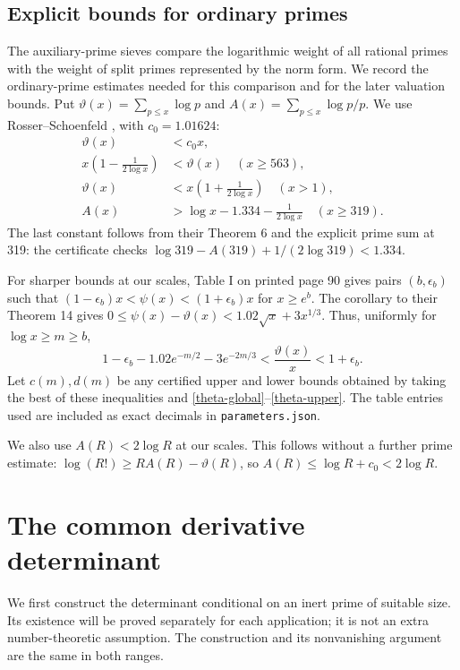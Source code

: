 \documentclass[11pt]{article}
\begin{document}
\subsection{Explicit bounds for ordinary primes}\label{prime-inputs}
The auxiliary-prime sieves compare the logarithmic weight of all rational primes
with the weight of split primes represented by the norm form. We record
the ordinary-prime estimates needed for this comparison and for the
later valuation bounds.
Put \(\vartheta(x)=\sum_{p\le x}\log p\) and
\(A(x)=\sum_{p\le x}\log p/p\). We use Rosser--Schoenfeld
\cite{rs}, with \(c_0=1.01624\):
\begin{align}
 \vartheta(x)&<c_0x,\label{theta-global}\\
 x\left(1-\frac1{2\log x}\right)&<\vartheta(x)
       \quad(x\ge563),\label{theta-lower}\\
 \vartheta(x)&<x\left(1+\frac1{2\log x}\right)\quad(x>1),\label{theta-upper}\\
 A(x)&>\log x-1.334-\frac1{2\log x}\quad(x\ge319).
 \label{mertens}
\end{align}
The last constant follows from their Theorem 6 and the explicit prime
sum at 319: the certificate checks
\(\log319-A(319)+1/(2\log319)<1.334\).

For sharper bounds at our scales, Table I on printed page 90 gives
pairs \((b,\epsilon_b)\) such that
\((1-\epsilon_b)x<\psi(x)<(1+\epsilon_b)x\) for \(x\ge e^b\).
The corollary to their Theorem 14 gives
\(0\le\psi(x)-\vartheta(x)<1.02\sqrt x+3x^{1/3}\).
Thus, uniformly for \(\log x\ge m\ge b\),
\begin{equation}\label{tabletheta}
 1-\epsilon_b-1.02e^{-m/2}-3e^{-2m/3}
 <\frac{\vartheta(x)}x<1+\epsilon_b.
\end{equation}
Let \(c(m),d(m)\) be any certified upper and lower bounds obtained
by taking the best of these inequalities and
\eqref{theta-global}--\eqref{theta-upper}. The table entries used are
included as exact decimals in \texttt{parameters.json}.

We also use \(A(R)<2\log R\) at our scales. This follows without a
further prime estimate: \(\log(R!)\ge RA(R)-\vartheta(R)\), so
\(A(R)\le\log R+c_0<2\log R\).

\section{The common derivative determinant}\label{determinant}
We first construct the determinant conditional on an inert prime of
suitable size. Its existence will be proved separately for each
application; it is not an extra number-theoretic assumption. The
construction and its nonvanishing argument are the same in both ranges.
\end{document}
